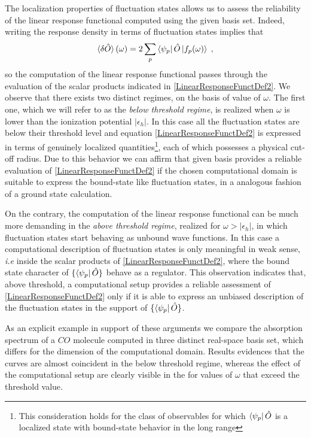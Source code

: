 \documentclass[reprint,aps,prb]{revtex4-1}
\newcommand{\eps}{\epsilon}
\newcommand{\be}{\begin{equation}}
\newcommand{\ee}{\end{equation}}
\newcommand{\lb}{\label}
\newcommand{\op}[1]{\hat {#1}}
\begin{document}
The localization properties of fluctuation states allows us to assess the reliability of the linear response functional computed using the given basis set. Indeed, writing the response 
density in terms of fluctuation states implies that 
\be\lb{LinearResponseFunctDef2}
\braket{\delta\op O}(\omega) = 2\sum_p \bra{\psi_p}\op O\ket{f_p(\omega)} \;,
\ee
so the computation of the linear response functional passes through the evaluation of the scalar products indicated in \eqref{LinearResponseFunctDef2}. 
We observe that there exists two distinct regimes, on the basis of value of $\omega$. The first one, which we will refer to as the \emph{below threshold regime}, is realized when $\omega$ 
is lower than the ionization potential $|\eps_h|$. In this case all the fluctuation states are below their threshold level and equation \eqref{LinearResponseFunctDef2} is expressed in terms 
of genuinely localized quantities\footnote{This consideration holds for the class of observables for which $\bra{\psi_p}\op O$ is a localized state  with bound-state behavior in the long 
range}, each of which possesses a physical cut-off radius.
Due to this behavior we can affirm that given basis provides a reliable evaluation of \eqref{LinearResponseFunctDef2} if the chosen computational domain is suitable to express the
bound-state like fluctuation states, in a analogous fashion of a ground state calculation. 

On the contrary, the computation of the linear response functional can be much more demanding in the \emph{above threshold regime}, realized for $\omega>|\eps_h|$, in which fluctuation 
states start behaving as unbound wave functions. In this case a computational description of fluctuation states is only meaningful in weak sense, \emph{i.e} inside the scalar products of 
\eqref{LinearResponseFunctDef2}, where the bound state character of $\{\bra{\psi_p}\op O\}$ behave as a regulator. This observation indicates that, above threshold, a computational setup 
provides a reliable assessment of \eqref{LinearResponseFunctDef2} only if it is able to express an unbiased description of the fluctuation states in the support of $\{\bra{\psi_p}\op O\}$. 

As an explicit example in support of these arguments we compare the absorption spectrum of a $CO$ molecule computed in three distinct real-space basis set, which differs for the 
dimension of the computational domain. Results evidences that the curves are almost coincident in the below threshold regime, whereas the effect of the computational setup are clearly
visible in the for values of $\omega$ that exceed the threshold value. 
\end{document}
